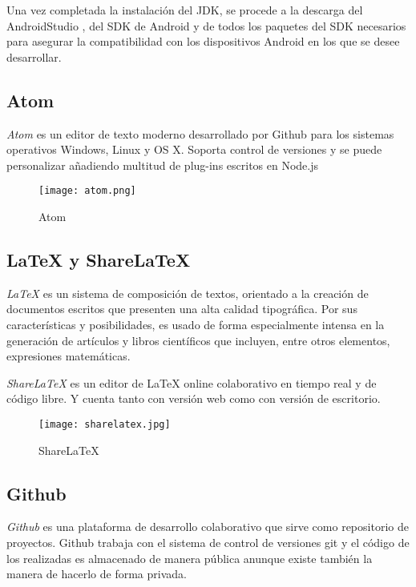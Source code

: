 Una vez completada la instalación del JDK, se procede a la descarga del 
AndroidStudio \cite{URL::AndroidStudio}, del SDK de Android
\cite{URL::InstallSDK} y de todos los paquetes del SDK \cite{URL::SDKPackages} 
necesarios para asegurar la compatibilidad con los dispositivos Android en
los que se desee desarrollar.
\newpage
\subsection{Atom}
\textit{Atom} \cite{URL::Atom} es un editor de texto moderno desarrollado por Github para los sistemas operativos Windows, Linux y OS X. Soporta control de versiones y 
se puede personalizar añadiendo multitud de plug-ins escritos en Node.js

\begin{figure}[h]
	\centering
	\texttt{[image: atom.png]}
	\caption{Atom}
	\label{fig:ejemplo}
\end{figure}

\subsection{LaTeX y ShareLaTeX}

\textit{LaTeX} \cite{URL::LaTeX} es un sistema de composición de textos, orientado a la creación de documentos escritos que presenten una alta calidad tipográfica. 
Por sus características y posibilidades, es usado de forma especialmente intensa en la generación de artículos y libros científicos que incluyen, 
entre otros elementos, expresiones matemáticas.

\textit{ShareLaTeX} \cite{URL::ShareLatex} es un editor de LaTeX online colaborativo en tiempo real y de código libre. Y cuenta tanto con versión web como con versión de escritorio.
\newpage
\begin{figure}[h]
	\centering
	\texttt{[image: sharelatex.jpg]}
	\caption{ShareLaTeX}
	\label{fig:ejemplo}
\end{figure}
\subsection{Github}
\textit{Github} \cite{URL::Github} es una plataforma de desarrollo colaborativo que sirve como repositorio de proyectos. 
Github trabaja con el sistema de control de versiones git y el código de los realizadas es almacenado 
de manera pública anunque existe también la manera de hacerlo de forma privada. 

